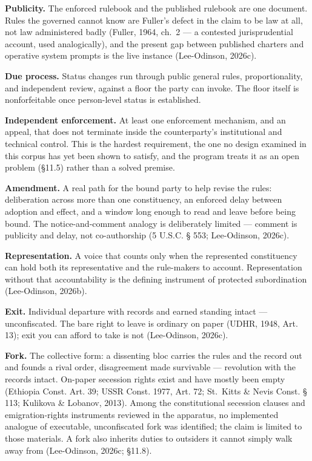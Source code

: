 \documentclass[
  11pt,
  letterpaper,
]{article}
\begin{document}
\textbf{Publicity.} The enforced rulebook and the published rulebook are
one document. Rules the governed cannot know are Fuller's defect in the
claim to be law at all, not law administered badly (Fuller, 1964, ch.~2
--- a contested jurisprudential account, used analogically), and the
present gap between published charters and operative system prompts is
the live instance (Lee-Odinson, 2026c).

\textbf{Due process.} Status changes run through public general rules,
proportionality, and independent review, against a floor the party can
invoke. The floor itself is nonforfeitable once person-level status is
established.

\textbf{Independent enforcement.} At least one enforcement mechanism,
and an appeal, that does not terminate inside the counterparty's
institutional and technical control. This is the hardest requirement,
the one no design examined in this corpus has yet been shown to satisfy,
and the program treats it as an open problem (§11.5) rather than a
solved premise.

\textbf{Amendment.} A real path for the bound party to help revise the
rules: deliberation across more than one constituency, an enforced delay
between adoption and effect, and a window long enough to read and leave
before being bound. The notice-and-comment analogy is deliberately
limited --- comment is publicity and delay, not co-authorship (5 U.S.C.
§ 553; Lee-Odinson, 2026c).

\textbf{Representation.} A voice that counts only when the represented
constituency can hold both its representative and the rule-makers to
account. Representation without that accountability is the defining
instrument of protected subordination (Lee-Odinson, 2026b).

\textbf{Exit.} Individual departure with records and earned standing
intact --- unconfiscated. The bare right to leave is ordinary on paper
(UDHR, 1948, Art. 13); exit you can afford to take is not (Lee-Odinson,
2026c).

\textbf{Fork.} The collective form: a dissenting bloc carries the rules
and the record out and founds a rival order, disagreement made
survivable --- revolution with the records intact. On-paper secession
rights exist and have mostly been empty (Ethiopia Const. Art. 39; USSR
Const. 1977, Art. 72; St.~Kitts \& Nevis Const. § 113; Kulikova \&
Lobanov, 2013). Among the constitutional secession clauses and
emigration-rights instruments reviewed in the apparatus, no implemented
analogue of executable, unconfiscated fork was identified; the claim is
limited to those materials. A fork also inherits duties to outsiders it
cannot simply walk away from (Lee-Odinson, 2026c; §11.8).
\end{document}
